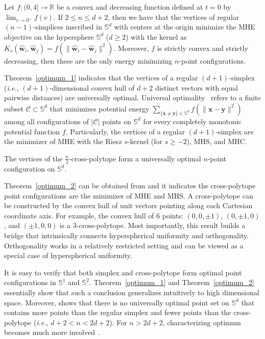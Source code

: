 \begin{theorem}\label{optimum_1}
Let $f:(0,4]\rightarrow \mathbb{R}$ be a convex and decreasing function defined at $t=0$ by $\lim_{v\rightarrow0^+}f(v)$. If $2\leq n\leq d+2$, then we have that the vertices of regular $(n-1)$-simplices inscribed in $\mathbb{S}^d$ with centers at the origin minimize the MHE objective on the hypersphere $\mathbb{S}^d$ ($d\geq2$) with the kernel as $K_s(\hat{\bm{w}}_i,\hat{\bm{w}}_j)=f(\|\hat{\bm{w}}_i-\hat{\bm{w}}_j\|^2)$. Moreover, $f$ is strictly convex and strictly decreasing, then these are the only energy minimizing $n$-point configurations.
\end{theorem}

Theorem~\ref{optimum_1} indicates that the vertices of a regular $(d+1)$-simplex (\emph{i.e.}, $(d+1)$-dimensional convex hull of $d+2$ distinct vectors with equal pairwise distances) are universally optimal. Universal optimality~\cite{cohn2007universally} refers to a finite subset $\mathcal{C}\subset\mathbb{S}^d$ that minimizes potential energy $\sum_{\{\bm{x}\neq\bm{y}\}\in \mathbb{S}^d} f(\|\bm{x}-\bm{y}\|^2)$ among all configurations of $|\mathcal{C}|$ points on $\mathbb{S}^d$ for every completely monotonic potential function $f$. Particularly, the vertices of a regular $(d+1)$-simplex are the minimizer of MHE with the Riesz $s$-kernel (for $s\geq-2$), MHS, and MHC.

\begin{theorem}[Cross-polytope optimum for $n= 2d+2$]\label{optimum_2}
The vertices of the $\frac{n}{2}$-cross-polytope form a universally optimal $n$-point configuration on $\mathbb{S}^d$.
\end{theorem}

Theorem~\ref{optimum_2} can be obtained from \cite{borodachov2019discrete,cohn2007universally,kolushov1997extremal,yudin1992minimum} and it indicates the cross-polytope point configurations are the minimizer of MHE and MHS. A cross-polytope can be constructed by the convex hull of unit vectors pointing along each Cartesian coordinate axis. For example, the convex hull of 6 points: $(0,0,\pm1)$, $(0,\pm1,0)$, and $(\pm1,0,0)$ is a $3$-cross-polytope. Most importantly, this result builds a bridge that intrinsically connects hyperspherical uniformity and orthogonality. Orthogonality works in a relatively restricted setting and can be viewed as a special case of hyperspherical uniformity.

It is easy to verify that both simplex and cross-polytope form optimal point configurations in $\mathbb{S}^1$ and $\mathbb{S}^2$. Theorem~\ref{optimum_1} and Theorem~\ref{optimum_2} essentially show that such a conclusion generalizes intuitively to high dimensional space. Moreover, \cite{cohn2007universally} shows that there is no universally optimal point set on $\mathbb{S}^d$ that contains more points than the regular simplex and fewer points than the cross-polytope (\emph{i.e.}, $d+2<n<2d+2$). For $n>2d+2$, characterizing optimum becomes much more involved~\cite{borodachov2019discrete}.

